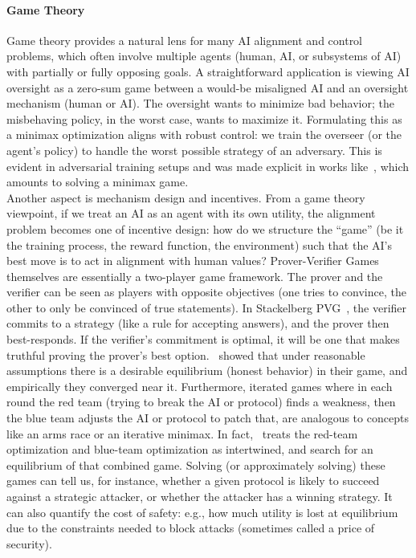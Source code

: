 \paragraph{Game Theory} Game theory provides a natural lens for many AI alignment and control problems, which often involve multiple agents (human, AI, or subsystems of AI) with partially or fully opposing goals. A straightforward application is viewing AI oversight as a zero-sum game between a would-be misaligned AI and an oversight mechanism (human or AI). The oversight wants to minimize bad behavior; the misbehaving policy, in the worst case, wants to maximize it. Formulating this as a minimax optimization aligns with robust control: we train the overseer (or the agent’s policy) to handle the worst possible strategy of an adversary. This is evident in adversarial training setups and was made explicit in works like~\citet{pinto2017robust}, which amounts to solving a minimax game.
\\
Another aspect is mechanism design and incentives. From a game theory viewpoint, if we treat an AI as an agent with its own utility, the alignment problem becomes one of incentive design: how do we structure the ``game'' (be it the training process, the reward function, the environment) such that the AI’s best move is to act in alignment with human values? Prover-Verifier Games themselves are essentially a two-player game framework. The prover and the verifier can be seen as players with opposite objectives (one tries to convince, the other to only be convinced of
true statements). In Stackelberg PVG~\citep{anil2021learning}, the verifier commits to a strategy (like a rule for accepting answers), and the prover then best-responds. If the verifier’s commitment is optimal, it will be one that makes truthful proving the prover’s best option.~\citet{anil2021learning} showed that under reasonable assumptions there is a desirable equilibrium (honest behavior) in their game, and empirically they converged near it. Furthermore, iterated games where in each round the red team (trying to break the AI or protocol)
finds a weakness, then the blue team adjusts the AI or protocol to patch that, are analogous to concepts like an arms race or an iterative minimax. In fact,~\citet{griffin2024games} treats the red-team optimization and blue-team optimization as intertwined, and search for an equilibrium of that combined game. Solving (or approximately solving) these games can tell us, for instance, whether a given protocol is likely to succeed against a strategic attacker, or whether the attacker has a winning strategy. It can also quantify the cost of safety: e.g., how much utility is lost at equilibrium due to the constraints needed to block attacks (sometimes called a price of security).